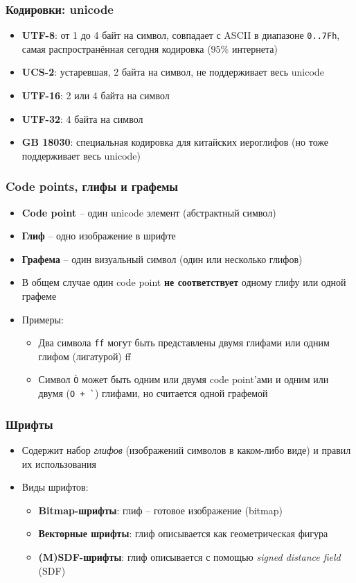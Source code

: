 \documentclass{beamer}
\begin{document}
\begin{frame}[fragile]
\frametitle{Кодировки: unicode}
\begin{itemize}
\item \textbf{UTF-8}: от 1 до 4 байт на символ, совпадает с ASCII в диапазоне \verb|0..7Fh|, самая распространённая сегодня кодировка (95\% интернета)
\pause
\item \textbf{UCS-2}: устаревшая, 2 байта на символ, не поддерживает весь unicode
\pause
\item \textbf{UTF-16}: 2 или 4 байта на символ
\pause
\item \textbf{UTF-32}: 4 байта на символ
\pause
\item \textbf{GB 18030}: специальная кодировка для китайских иероглифов (но тоже поддерживает весь unicode)
\end{itemize}
\end{frame}

\begin{frame}[fragile]
\frametitle{Code points, глифы и графемы}
\begin{itemize}
\item \textbf{Code point} -- один unicode элемент (абстрактный символ)
\pause
\item \textbf{Глиф} -- одно изображение в шрифте
\pause
\item \textbf{Графема} -- один визуальный символ (один или несколько глифов)
\pause
\item В общем случае один code point \alert{\textbf{не соответствует}} одному глифу или одной графеме
\pause
\item Примеры:
\begin{itemize}
\item Два символа \verb|ff| могут быть представлены двумя глифами или одним глифом (лигатурой) ff
\pause
\item Символ \verb|Ò| может быть одним или двумя code point'ами и одним или двумя (\verb|O + `|) глифами, но считается одной графемой
\end{itemize}
\end{itemize}
\end{frame}

\begin{frame}[fragile]
\frametitle{Шрифты}
\begin{itemize}
\item Содержит набор \textit{глифов} (изображений символов в каком-либо виде) и правил их использования
\pause
\item Виды шрифтов:
\pause
\begin{itemize}
\item \textbf{Bitmap-шрифты}: глиф -- готовое изображение (bitmap)
\pause
\item \textbf{Векторные шрифты}: глиф описывается как геометрическая фигура
\pause
\item \textbf{(M)SDF-шрифты}: глиф описывается с помощью \textit{signed distance field} (SDF)
\end{itemize}
\end{itemize}
\end{frame}
\end{document}
